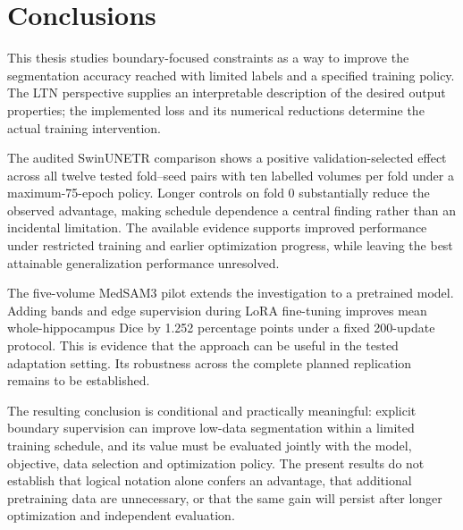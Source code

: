 \section{Conclusions}\label{sec:conclusion}
This thesis studies boundary-focused constraints as a way to improve the segmentation accuracy reached with limited labels and a specified training policy. The LTN perspective supplies an interpretable description of the desired output properties; the implemented loss and its numerical reductions determine the actual training intervention.

The audited SwinUNETR comparison shows a positive validation-selected effect across all twelve tested fold--seed pairs with ten labelled volumes per fold under a maximum-75-epoch policy. Longer controls on fold 0 substantially reduce the observed advantage, making schedule dependence a central finding rather than an incidental limitation. The available evidence supports improved performance under restricted training and earlier optimization progress, while leaving the best attainable generalization performance unresolved.

The five-volume MedSAM3 pilot extends the investigation to a pretrained model. Adding bands and edge supervision during LoRA fine-tuning improves mean whole-hippocampus Dice by 1.252 percentage points under a fixed 200-update protocol. This is evidence that the approach can be useful in the tested adaptation setting. Its robustness across the complete planned replication remains to be established.

The resulting conclusion is conditional and practically meaningful: explicit boundary supervision can improve low-data segmentation within a limited training schedule, and its value must be evaluated jointly with the model, objective, data selection and optimization policy. The present results do not establish that logical notation alone confers an advantage, that additional pretraining data are unnecessary, or that the same gain will persist after longer optimization and independent evaluation.

